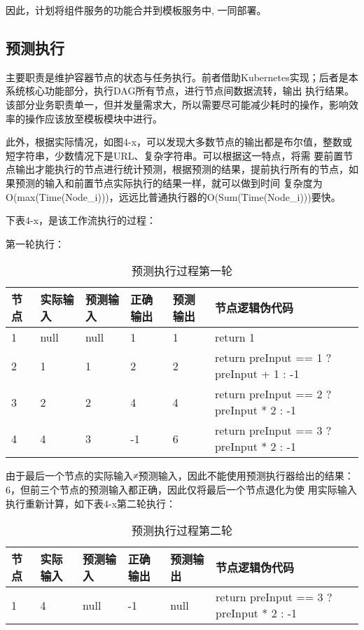 因此，计划将组件服务的功能合并到模板服务中, 一同部署。

\subsection{预测执行}

主要职责是维护容器节点的状态与任务执行。前者借助Kubernetes实现；后者是本系统核心功能部分，执行DAG所有节点，进行节点间数据流转，输出
执行结果。该部分业务职责单一，但并发量需求大，所以需要尽可能减少耗时的操作，影响效率的操作应该放至模板模块中进行。




此外，根据实际情况，如图4-x，可以发现大多数节点的输出都是布尔值，整数或短字符串，少数情况下是URL、复杂字符串。可以根据这一特点，将需
要前置节点输出才能执行的节点进行统计预测，根据预测的结果，提前执行所有的节点，如果预测的输入和前置节点实际执行的结果一样，就可以做到时间
复杂度为O(max(Time(Node\_i)))，远远比普通执行器的O(Sum(Time(Node\_i)))要快。


下表4-x，是该工作流执行的过程：

第一轮执行：
\begin{table}[H]
    \centering
    \caption{预测执行过程第一轮}
    \label{tab:predict_process_1}
    \begin{tabular}{llllll}
        \toprule
        节点 &实际输入 &预测输入 &正确输出 &预测输出 &节点逻辑伪代码\\
        \midrule
        1 &null    &null   &1       &1       &return 1 \\
        2 &1       &1      &2       &2       &return preInput == 1 ? preInput + 1 : -1 \\
        3 &2       &2      &4       &4       &return preInput == 2 ? preInput * 2 : -1 \\
        4 &4       &3      &-1      &6       &return preInput == 3 ? preInput * 2 : -1 \\
        \bottomrule
    \end{tabular}
\end{table}
由于最后一个节点的实际输入≠预测输入，因此不能使用预测执行器给出的结果：6，但前三个节点的预测输入都正确，因此仅将最后一个节点退化为使
用实际输入执行重新计算，如下表4-x第二轮执行：

\begin{table}[H]
    \centering
    \caption{预测执行过程第二轮}
    \label{tab:predict_process_2}
    \begin{tabular}{llllll}
        \toprule
        节点 &实际输入 &预测输入 &正确输出 &预测输出 &节点逻辑伪代码\\
        \midrule
        1 &4       &null      &-1      &null       &return preInput == 3 ? preInput * 2 : -1
    \end{tabular}
\end{table}


